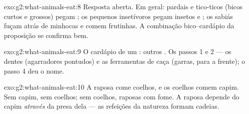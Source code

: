 \begin{solution}{exo:g2:what-animals-eat:8}
Resposta aberta. Em geral: pardais e tico-ticos (bicos curtos e
grossos) pegam ; os pequenos insetívoros pegam insetos e
; os sabiás fuçam atrás de minhocas e comem frutinhas. A
combinação bico--cardápio da proposição se confirma bem.
\end{solution}

\begin{solution}{exo:g2:what-animals-eat:9}
O cardápio de um : outros . Os passos 1 e 2 --- os
dentes (agarradores pontudos) e as ferramentas de caça (garras,
 para a frente); o passo 4 deu o nome.
\end{solution}

\begin{solution}{exo:g2:what-animals-eat:10}
A raposa come coelhos, e os coelhos comem capim. Sem capim, sem
coelhos; sem coelhos, raposas com fome. A raposa depende do capim
\emph{através} da presa dela --- as refeições da natureza formam
cadeias.
\end{solution}
